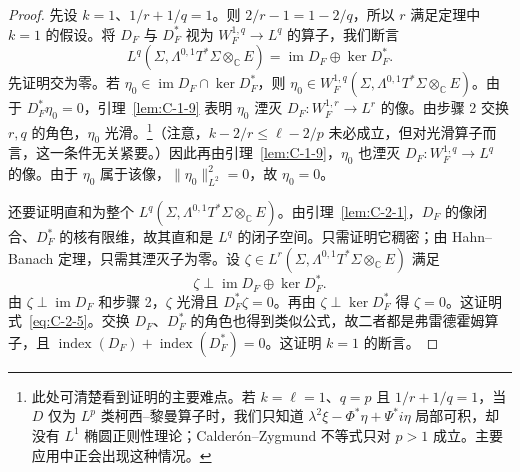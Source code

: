 \begin{proof}
先设 $k=1$、$1/r+1/q=1$。则 $2/r-1=1-2/q$，所以 $r$ 满足定理中 $k=1$ 的假设。将 $D_F$ 与 $D_F^*$ 视为 $W_F^{1,q}\to L^q$ 的算子，我们断言
\begin{equation}\label{eq:C-2-5}
  L^q(\Sigma,\Lambda^{0,1}T^*\Sigma\otimes_{\mathbb C}E)
  =\operatorname{im}D_F\oplus\ker D_F^*.
\end{equation}
先证明交为零。若 $\eta_0\in\operatorname{im}D_F\cap\ker D_F^*$，则 $\eta_0\in W_F^{1,q}(\Sigma,\Lambda^{0,1}T^*\Sigma\otimes_{\mathbb C}E)$。由于 $D_F^*\eta_0=0$，引理~\ref{lem:C-1-9} 表明 $\eta_0$ 湮灭 $D_F:W_F^{1,r}\to L^r$ 的像。由步骤 2 交换 $r,q$ 的角色，$\eta_0$ 光滑。\footnote{此处可清楚看到证明的主要难点。若 $k=\ell=1$、$q=p$ 且 $1/r+1/q=1$，当 $D$ 仅为 $L^p$ 类柯西–黎曼算子时，我们只知道 $\lambda^2\xi-\Phi^*\eta+\Psi^*i\eta$ 局部可积，却没有 $L^1$ 椭圆正则性理论；Calderón--Zygmund 不等式只对 $p>1$ 成立。主要应用中正会出现这种情况。}（注意，$k-2/r\le\ell-2/p$ 未必成立，但对光滑算子而言，这一条件无关紧要。）因此再由引理~\ref{lem:C-1-9}，$\eta_0$ 也湮灭 $D_F:W_F^{1,q}\to L^q$ 的像。由于 $\eta_0$ 属于该像，$\|\eta_0\|_{L^2}^2=0$，故 $\eta_0=0$。

还要证明直和为整个 $L^q(\Sigma,\Lambda^{0,1}T^*\Sigma\otimes_{\mathbb C}E)$。由引理~\ref{lem:C-2-1}，$D_F$ 的像闭合、$D_F^*$ 的核有限维，故其直和是 $L^q$ 的闭子空间。只需证明它稠密；由 Hahn--Banach 定理，只需其湮灭子为零。设 $\zeta\in L^r(\Sigma,\Lambda^{0,1}T^*\Sigma\otimes_{\mathbb C}E)$ 满足
\[
  \zeta\perp\operatorname{im}D_F\oplus\ker D_F^*.
\]
由 $\zeta\perp\operatorname{im}D_F$ 和步骤 2，$\zeta$ 光滑且 $D_F^*\zeta=0$。再由 $\zeta\perp\ker D_F^*$ 得 $\zeta=0$。这证明式~\eqref{eq:C-2-5}。交换 $D_F$、$D_F^*$ 的角色也得到类似公式，故二者都是弗雷德霍姆算子，且 $\operatorname{index}(D_F)+\operatorname{index}(D_F^*)=0$。这证明 $k=1$ 的断言。


\end{proof}
